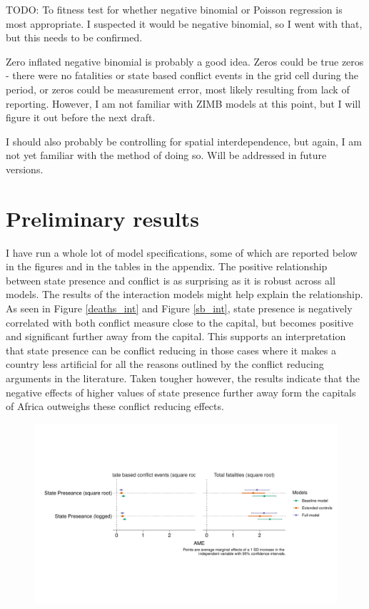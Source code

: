 \documentclass[12pt]{article}
\begin{document}
TODO: To fitness test for whether negative binomial or Poisson regression is
most appropriate. I suspected it would be negative binomial, so I went with
that, but this needs to be confirmed.

Zero inflated negative binomial is probably a good idea. Zeros could be true
zeros - there were no fatalities or state based conflict events in the grid cell
during the period, or zeros could be measurement error, most likely resulting
from lack of reporting. However, I am not familiar with ZIMB models at this
point, but I will figure it out before the next draft.

I should also probably be controlling for spatial interdependence, but again, I
am not yet familiar with the method of doing so. Will be addressed in future
versions.

\section{Preliminary results}

I have run a whole lot of model specifications, some of which are reported below
in the figures and in the tables in the appendix. The positive relationship
between state presence and conflict is as surprising as it is robust across all
models. The results of the interaction models might help explain the
relationship. As seen in Figure \ref{deaths_int} and Figure \ref{sb_int}, state
presence is negatively correlated with both conflict measure close to the
capital, but becomes positive and significant further away from the capital.
This supports an interpretation that state presence can be conflict reducing in
those cases where it makes a country less artificial for all the reasons
outlined by the conflict reducing arguments in the literature. Taken tougher
however, the results indicate that the negative effects of higher values of
state presence further away form the capitals of Africa outweighs these conflict
reducing effects. 

\begin{figure}[htpb]
	\centering
	\includegraphics[width=\linewidth]{"../R/Output/conflictMargins.pdf"}
	\caption{}
	\label{margins}
\end{figure}
\end{document}
